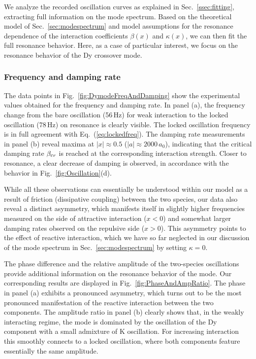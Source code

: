 We analyze the recorded oscillation curves as explained in Sec.~\ref{ssec:fitting}, extracting full information on the mode spectrum. Based on the theoretical model of Sec.~\ref{sec:modespectrum} and model assumptions for the resonance dependence of the interaction coefficients $\beta(x)$ and $\kappa(x)$, we can then fit the full resonance behavior. Here, as a case of particular interest, we focus on the resonance behavior of the Dy crossover mode. %

\subsubsection{Frequency and damping rate}

The data points in Fig.~\ref{fig:DymodeFreqAndDamping} 
show the experimental values obtained for the frequency and damping rate. %
In panel (a), the frequency change from the bare oscillation (56\,Hz) for weak interaction to the locked oscillation (78\,Hz) on resonance is clearly visible. The locked oscillation frequency is in full agreement with Eq.~(\ref{eq:lockedfreq}).
The damping rate measurements in panel (b) reveal maxima at $|x| \approx 0.5$ ($|a| \approx 2000\,a_0$), 
indicating that the critical damping rate $\beta_{\textrm cr}$ is reached at the corresponding interaction strength. Closer to resonance, a clear decrease of damping is observed, in accordance with the behavior in Fig.~\ref{fig:Oscillation}(d).

While all these observations can essentially be understood within our model as a result of friction (dissipative coupling) between the two species, our data also reveal a distinct asymmetry, 
which manifests itself in slightly  higher frequencies measured on the side of attractive interaction ($x<0$) and somewhat larger damping rates observed on the repulsive side ($x>0$). This asymmetry points to the effect of reactive interaction, which we have so far neglected in our discussion of the mode spectrum in Sec.~\ref{sec:modespectrum} by setting 
$\kappa = 0$. 

The phase difference and the relative amplitude of the two-species oscillations provide additional information on the resonance behavior of the mode. 
Our corresponding results are displayed
in Fig.~\ref{fig:PhaseAndAmpRatio}. 
The phase in panel (a) exhibits a pronounced asymmetry, which turns out to be the most pronounced manifestation of the reactive interaction between the two components.
The amplitude ratio in panel (b) clearly shows that, in the weakly interacting regime, the mode is dominated by the oscillation of the Dy component with a small admixture of K oscillation. For increasing interaction this smoothly connects to a locked oscillation, where both components feature essentially the same amplitude. 


